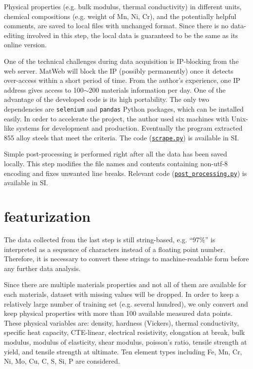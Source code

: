 \documentclass[10pt,aps,prb,amsmath,amssymb,twocolumn,letterpaper,nobalancelastpage,final,citeautoscript,floatfix,raggedbottom,superscriptaddress]{revtex4-1}
\begin{document}
Physical properties (e.g. bulk modulus, thermal conductivity) in different units, chemical compositions (e.g. weight of Mn, Ni, Cr), and the potentially helpful comments, are saved to local files with unchanged format. Since there is no data-editing involved in this step, the local data is guaranteed to be the same as its online version.

One of the technical challenges during data acquisition is IP-blocking from the web server. MatWeb will block the IP (possibly permanently) once it detects over-access within a short period of time. From the author's experience, one IP address gives access to 100$\sim$200 materials information per day. One of the advantage of the developed code is its high portability. The only two dependencies are \texttt{selenium} and \texttt{pandas} Python packages, which can be installed easily. In order to accelerate the project, the author used six machines with Unix-like systems for development and production. Eventually the program extracted 855 alloy steels that meet the criteria. The code (\hyperlink{scrape}{\texttt{scrape.py}}) is available in SI.

Simple post-processing is performed right after all the data has been saved locally. This step modifies the file names and contents containing non-utf-8 encoding and fixes unwanted line breaks. Relevant code (\hyperlink{pprocess}{\texttt{post\_processing.py}}) is available in SI.

\section{featurization}

The data collected from the last step is still string-based, e.g. ``97\%'' is interpreted as a sequence of characters instead of a floating point number. Therefore, it is necessary to convert these strings to machine-readable form before any further data analysis.

Since there are multiple materials properties and not all of them are available for each materials, dataset with missing values will be dropped. In order to keep a relatively large number of training set (e.g. several hundred), we only convert and keep physical properties with more than 100 available measured data points. These physical variables are: density, hardness (Vickers), thermal conductivity, specific heat capacity, CTE-linear, electrical resistivity, elongation at break, bulk modulus, modulus of elasticity, shear modulus, poisson's ratio, tensile strength at yield, and tensile strength at ultimate. Ten element types including Fe, Mn, Cr, Ni, Mo, Cu, C, S, Si, P are considered.
\end{document}
